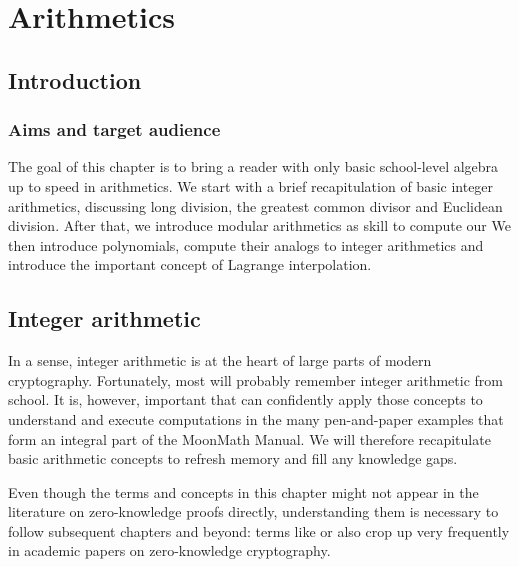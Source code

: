 \chapter{Arithmetics}\label{chap:arithmetic}\label{chap:arithmetics}

\section{Introduction}

\subsection{Aims and target audience}

The goal of this chapter is to bring a reader with only basic school-level algebra up to speed in arithmetics. We start with a brief recapitulation of basic integer arithmetics, discussing long division, the greatest common divisor and Euclidean division. After that, we introduce modular arithmetics as  skill to compute our  We then introduce polynomials, compute their analogs to integer arithmetics and introduce the important concept of Lagrange interpolation.

\section{Integer arithmetic}
\label{integer_arithmetic}
In a sense, integer arithmetic is at the heart of large parts of modern cryptography. Fortunately, most  will probably remember integer arithmetic from school. It is, however, important that  can confidently apply those concepts to understand and execute computations in the many pen-and-paper examples that form an integral part of the MoonMath Manual. We will therefore recapitulate basic arithmetic concepts to refresh  memory and fill any knowledge gaps.

Even though the terms and concepts in this chapter might not appear in the literature on zero-knowledge proofs directly, understanding them is necessary to follow subsequent chapters and beyond: terms like  or  also crop up very frequently in academic papers on zero-knowledge cryptography.

